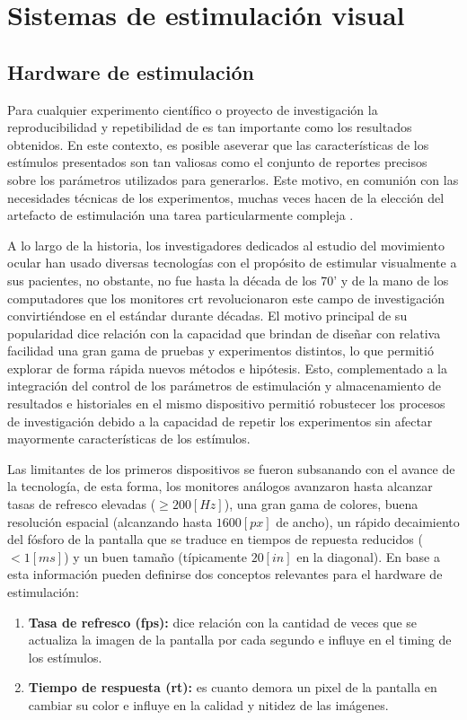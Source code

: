 \documentclass[../main.tex]{subfiles}
\begin{document}
	\section{Sistemas de estimulación visual}
	\label{sec:02_sistemas_de_estimulacion_visual}
		\subsection{Hardware de estimulación}
		\label{sub:02_hardware_de_estimulacion}

			Para cualquier experimento científico o proyecto de investigación la reproducibilidad y repetibilidad de es tan importante como los resultados obtenidos. En este contexto, es posible aseverar que las características de los estímulos presentados son tan valiosas como el conjunto de reportes precisos sobre los parámetros utilizados para generarlos. Este motivo, en comunión con las necesidades técnicas de los experimentos, muchas veces hacen de la elección del artefacto de estimulación una tarea particularmente compleja \cite{article:monitor_beuer}.

			A lo largo de la historia, los investigadores dedicados al estudio del movimiento ocular han usado diversas tecnologías con el propósito de estimular visualmente a sus pacientes, no obstante, no fue hasta la década de los 70' y de la mano de los computadores que los monitores \acrshort{crt} revolucionaron este campo de investigación convirtiéndose en el estándar durante décadas. El motivo principal de su popularidad dice relación con la capacidad que brindan de diseñar con relativa facilidad una gran gama de pruebas y experimentos distintos, lo que permitió explorar de forma rápida nuevos métodos e hipótesis. Esto, complementado a la integración del control de los parámetros de estimulación y almacenamiento de resultados e historiales en el mismo dispositivo permitió robustecer los procesos de investigación debido a la capacidad de repetir los experimentos sin afectar mayormente características de los estímulos. 

			Las limitantes de los primeros dispositivos se fueron subsanando con el avance de la tecnología, de esta forma, los monitores análogos avanzaron hasta alcanzar tasas de refresco elevadas ($\geq 200[Hz]$), una gran gama de colores, buena resolución espacial (alcanzando hasta $1600[px]$ de ancho), un rápido decaimiento del fósforo de la pantalla que se traduce en tiempos de repuesta reducidos ($< 1[ms]$) y un buen tamaño (típicamente $20[in]$ en la diagonal). En base a esta información pueden definirse dos conceptos relevantes para el hardware de estimulación: 
			\begin{enumerate}
				\item \textbf{Tasa de refresco (\acrshort{fps}):} dice relación con la cantidad de veces que se actualiza la imagen de la pantalla por cada segundo e influye en el timing de los estímulos.
				\item \textbf{Tiempo de respuesta (\acrshort{rt}):} es cuanto demora un pixel de la pantalla en cambiar su color e influye en la calidad y nitidez de las imágenes. 
			\end{enumerate}
\end{document}
